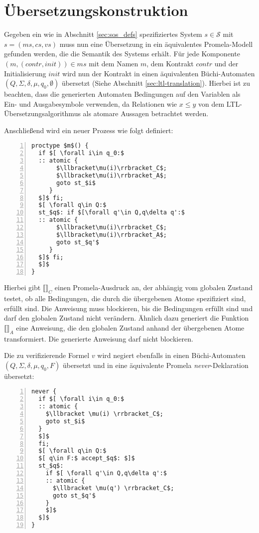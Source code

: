 \section{Übersetzungskonstruktion}
Gegeben ein wie in Abschnitt \ref{sec:sos_defs} spezifiziertes System $s\in \mathcal{S}$ mit $s=(ms,cs,vs)$ muss nun eine Übersetzung in ein äquivalentes Promela-Modell gefunden werden, die die Semantik des Systems erhält.
Für jede Komponente $(m,(\mathit{contr},\mathit{init}))\in ms$ mit dem Namen $m$, dem Kontrakt $\mathit{contr}$ und der Initialisierung $\mathit{init}$ wird nun der Kontrakt in einen äquivalenten Büchi-Automaten $(Q,\Sigma,\delta,\mu,q_0,\emptyset)$ übersetzt (Siehe Abschnitt \ref{sec:ltl-translation}).
Hierbei ist zu beachten, dass die generierten Automaten Bedingungen auf den Variablen als Ein- und Ausgabesymbole verwenden, da Relationen wie $x\leq y$ von dem LTL-Übersetzungsalgorithmus als atomare Aussagen betrachtet werden.


Anschließend wird ein neuer Prozess wie folgt definiert:
\begin{lstlisting}[language=Promela,mathescape=true,numbers=left,numberstyle=\small,caption={Komponenten-Übersetzung als Promela-Prozess}]
proctype $m$() {
  if $[ \forall i\in q_0:$
  :: atomic {
       $\llbracket\mu(i)\rrbracket_C$;
       $\llbracket\mu(i)\rrbracket_A$;
       goto st_$i$
     }
  $]$ fi;
  $[ \forall q\in Q:$
  st_$q$: if $[\forall q'\in Q,q\delta q':$
  :: atomic {
       $\llbracket\mu(i)\rrbracket_C$;
       $\llbracket\mu(i)\rrbracket_A$;
       goto st_$q'$
     }
  $]$ fi;
  $]$
}
\end{lstlisting}
Hierbei gibt $\llbracket\rrbracket_C$ einen Promela-Ausdruck an, der abhängig vom globalen Zustand testet, ob alle Bedingungen, die durch die übergebenen Atome spezifiziert sind, erfüllt sind.
Die Anweisung muss blockieren, bis die Bedingungen erfüllt sind und darf den globalen Zustand nicht verändern.
Ähnlich dazu generiert die Funktion $\llbracket\rrbracket_A$ eine Anweisung, die den globalen Zustand anhand der übergebenen Atome transformiert.
Die generierte Anweisung darf nicht blockieren.

Die zu verifizierende Formel $v$ wird negiert ebenfalls in einen Büchi-Automaten $(Q,\Sigma,\delta,\mu,q_0,F)$ übersetzt und in eine äquivalente Promela \emph{never}-Deklaration übersetzt:
\begin{lstlisting}[language=Promela,mathescape=true,numbers=left,numberstyle=\small,caption={Verifikationsziel-Übersetzung als \emph{never}-Prozess}]
never {
  if $[ \forall i\in q_0:$
  :: atomic {
    $\llbracket \mu(i) \rrbracket_C$;
    goto st_$i$
  }
  $]$
  fi;
  $[ \forall q\in Q:$
  $[ q\in F:$ accept_$q$: $]$
  st_$q$:
    if $[ \forall q'\in Q,q\delta q':$
    :: atomic {
      $\llbracket \mu(q') \rrbracket_C$;
      goto st_$q'$
    }
    $]$
  $]$
}
\end{lstlisting}

